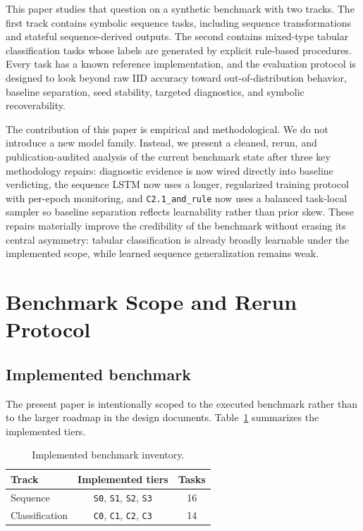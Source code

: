 \documentclass[11pt]{article}
\begin{document}
This paper studies that question on a synthetic benchmark with two tracks. The first track contains symbolic sequence tasks, including sequence transformations and stateful sequence-derived outputs. The second contains mixed-type tabular classification tasks whose labels are generated by explicit rule-based procedures. Every task has a known reference implementation, and the evaluation protocol is designed to look beyond raw IID accuracy toward out-of-distribution behavior, baseline separation, seed stability, targeted diagnostics, and symbolic recoverability.

The contribution of this paper is empirical and methodological. We do not introduce a new model family. Instead, we present a cleaned, rerun, and publication-audited analysis of the current benchmark state after three key methodology repairs: diagnostic evidence is now wired directly into baseline verdicting, the sequence LSTM now uses a longer, regularized training protocol with per-epoch monitoring, and \texttt{C2.1\_and\_rule} now uses a balanced task-local sampler so baseline separation reflects learnability rather than prior skew. These repairs materially improve the credibility of the benchmark without erasing its central asymmetry: tabular classification is already broadly learnable under the implemented scope, while learned sequence generalization remains weak.

\section{Benchmark Scope and Rerun Protocol}

\subsection{Implemented benchmark}

The present paper is intentionally scoped to the executed benchmark rather than to the larger roadmap in the design documents. Table~\ref{tab:inventory} summarizes the implemented tiers.

\begin{table}[H]
\centering
\caption{Implemented benchmark inventory.}
\label{tab:inventory}
\begin{tabular}{lcc}
\toprule
Track & Implemented tiers & Tasks \\
\midrule
Sequence & \texttt{S0}, \texttt{S1}, \texttt{S2}, \texttt{S3} & 16 \\
Classification & \texttt{C0}, \texttt{C1}, \texttt{C2}, \texttt{C3} & 14 \\
\bottomrule
\end{tabular}
\end{table}
\end{document}
